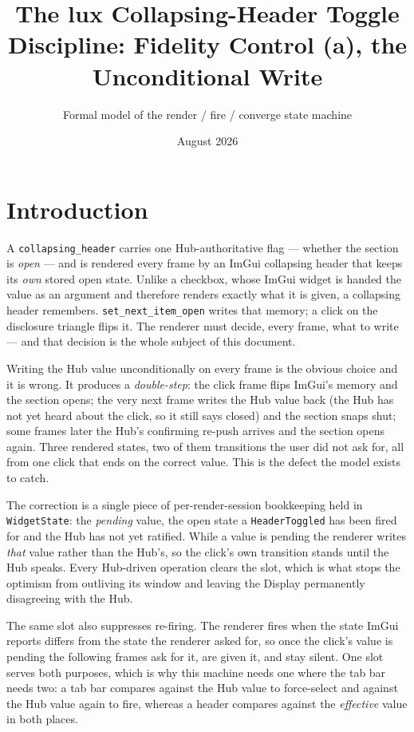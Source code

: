 \documentclass[a4paper,10pt,fleqn]{article}
\begin{document}
\title{The lux Collapsing-Header Toggle Discipline: Fidelity Control (a), the Unconditional Write}
\author{Formal model of the render / fire / converge state machine}
\date{August 2026}
\maketitle

\section{Introduction}

A \texttt{collapsing\_header} carries one Hub-authoritative flag --- whether the
section is \emph{open} --- and is rendered every frame by an ImGui collapsing
header that keeps its \emph{own} stored open state.  Unlike a checkbox, whose
ImGui widget is handed the value as an argument and therefore renders exactly
what it is given, a collapsing header remembers.  \texttt{set\_next\_item\_open}
writes that memory; a click on the disclosure triangle flips it.  The renderer
must decide, every frame, what to write --- and that decision is the whole
subject of this document.

Writing the Hub value unconditionally on every frame is the obvious choice and
it is wrong.  It produces a \emph{double-step}: the click frame flips ImGui's
memory and the section opens; the very next frame writes the Hub value back
(the Hub has not yet heard about the click, so it still says closed) and the
section snaps shut; some frames later the Hub's confirming re-push arrives and
the section opens again.  Three rendered states, two of them transitions the
user did not ask for, all from one click that ends on the correct value.  This
is the defect the model exists to catch.

The correction is a single piece of per-render-session bookkeeping held in
\texttt{WidgetState}: the \emph{pending} value, the open state a
\texttt{HeaderToggled} has been fired for and the Hub has not yet ratified.
While a value is pending the renderer writes \emph{that} value rather than the
Hub's, so the click's own transition stands until the Hub speaks.  Every
Hub-driven operation clears the slot, which is what stops the optimism from
outliving its window and leaving the Display permanently disagreeing with the
Hub.

The same slot also suppresses re-firing.  The renderer fires when the state
ImGui reports differs from the state the renderer asked for, so once the click's
value is pending the following frames ask for it, are given it, and stay silent.
One slot serves both purposes, which is why this machine needs one where the
tab bar needs two: a tab bar compares against the Hub value to force-select and
against the Hub value again to fire, whereas a header compares against the
\emph{effective} value in both places.
\end{document}
